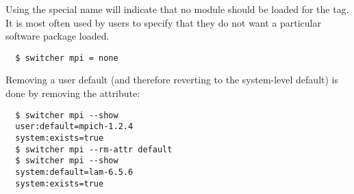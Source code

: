 Using the special name  will indicate that no module should
be loaded for the  tag.  It is most often used by users to
specify that they do not want a particular software package loaded.

\begin{verbatim}
  $ switcher mpi = none
\end{verbatim}


Removing a user default (and therefore reverting to the system-level
default) is done by removing the  attribute:

\begin{verbatim}
  $ switcher mpi --show
  user:default=mpich-1.2.4
  system:exists=true
  $ switcher mpi --rm-attr default
  $ switcher mpi --show
  system:default=lam-6.5.6
  system:exists=true
\end{verbatim}

